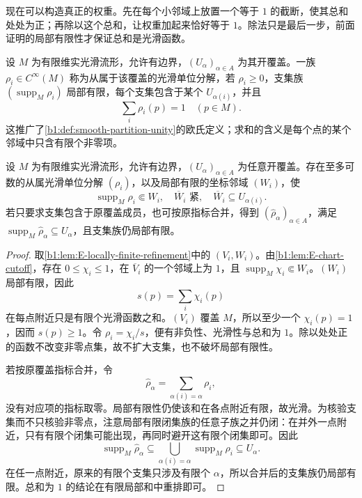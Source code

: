 现在可以构造真正的权重。先在每个小邻域上放置一个等于 \(1\) 的截断，使其总和处处为正；再除以这个总和，让权重加起来恰好等于 \(1\)。除法只是最后一步，前面证明的局部有限性才保证总和是光滑函数。

\begin{definition}[流形上的光滑单位分解]\label{b1:def:E-partition-unity}
设 \(M\) 为有限维实光滑流形，允许有边界，\((U_\alpha)_{\alpha\in A}\) 为其开覆盖。一族 \(\rho_i\in C^\infty(M)\) 称为从属于该覆盖的光滑单位分解，若 \(\rho_i\geq0\)，支集族 \((\operatorname{supp}_M\rho_i)\) 局部有限，每个支集包含于某个 \(U_{\alpha(i)}\)，并且
\[
 \sum_i\rho_i(p)=1\quad(p\in M).
\]
这推广了\cref{b1:def:smooth-partition-unity}的欧氏定义；求和的含义是每个点的某个邻域中只含有限个非零项。
\end{definition}

\begin{theorem}[光滑单位分解]\label{b1:thm:E-partition-unity}
设 \(M\) 为有限维实光滑流形，允许有边界，\((U_\alpha)_{\alpha\in A}\) 为任意开覆盖。存在至多可数的从属光滑单位分解 \((\rho_i)\)，以及局部有限的坐标邻域 \((W_i)\)，使
\[
 \operatorname{supp}_M\rho_i\Subset W_i,
 \quad\overline W_i\text{ 紧},\quad
 \overline W_i\subseteq U_{\alpha(i)}.
\]
若只要求支集包含于原覆盖成员，也可按原指标合并，得到 \((\widehat\rho_\alpha)_{\alpha\in A}\)，满足 \(\operatorname{supp}_M\widehat\rho_\alpha\subseteq U_\alpha\)，且支集族仍局部有限。
\end{theorem}
\begin{proof}
取\cref{b1:lem:E-locally-finite-refinement}中的 \((V_i,W_i)\)。由\cref{b1:lem:E-chart-cutoff}，存在 \(0\leq\chi_i\leq1\)，在 \(\overline V_i\) 的一个邻域上为 \(1\)，且 \(\operatorname{supp}_M\chi_i\Subset W_i\)。\((W_i)\) 局部有限，因此
\[
 s(p)=\sum_i\chi_i(p)
\]
在每点附近只是有限个光滑函数之和。\((V_i)\) 覆盖 \(M\)，所以至少一个 \(\chi_i(p)=1\)，因而 \(s(p)\geq1\)。令 \(\rho_i=\chi_i/s\)，便有非负性、光滑性与总和为 \(1\)。除以处处正的函数不改变非零点集，故不扩大支集，也不破坏局部有限性。

若按原覆盖指标合并，令
\[
 \widehat\rho_\alpha=\sum_{\alpha(i)=\alpha}\rho_i,
\]
没有对应项的指标取零。局部有限性仍使该和在各点附近有限，故光滑。为核验支集而不只核验非零点，注意局部有限闭集族的任意子族之并仍闭：在并外一点附近，只有有限个闭集可能出现，再同时避开这有限个闭集即可。因此
\[
 \operatorname{supp}_M\widehat\rho_\alpha
 \subseteq\bigcup_{\alpha(i)=\alpha}\operatorname{supp}_M\rho_i
 \subseteq U_\alpha.
\]
在任一点附近，原来的有限个支集只涉及有限个 \(\alpha\)，所以合并后的支集族仍局部有限。总和为 \(1\) 的结论在有限局部和中重排即可。
\end{proof}

